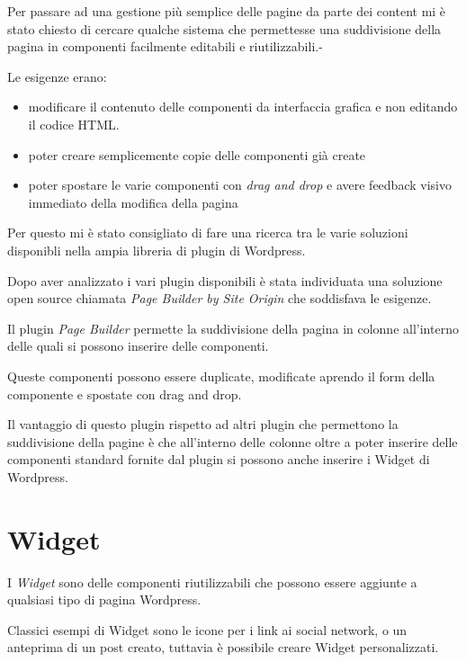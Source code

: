 


Per passare ad una gestione più semplice delle pagine da parte dei content
mi è stato chiesto di cercare qualche sistema che permettesse una suddivisione
della pagina in componenti facilmente editabili e riutilizzabili.-

Le esigenze erano:
\begin{itemize}
\item modificare il contenuto delle componenti da interfaccia grafica e non 
editando il codice HTML.
\item poter creare semplicemente copie delle componenti già create
\item poter spostare le varie componenti con \emph{drag and drop} e avere
feedback visivo immediato della modifica della pagina
\end{itemize}

Per questo mi è stato consigliato di fare una ricerca tra le varie soluzioni disponibli
nella ampia libreria di plugin di Wordpress.


Dopo aver analizzato i vari plugin disponibili è stata individuata una soluzione open source chiamata \emph{Page Builder by
Site Origin} che soddisfava le esigenze.

Il plugin \emph{Page Builder} permette la suddivisione della pagina in colonne all'interno delle quali
si possono inserire delle componenti.

Queste componenti possono essere duplicate, modificate aprendo il form della componente e spostate
con drag and drop.


Il vantaggio di questo plugin rispetto ad altri plugin che permettono la suddivisione della pagine è che all'interno delle colonne
oltre a poter inserire delle componenti standard fornite dal plugin si possono anche inserire i Widget di Wordpress.

\section{Widget}
I \emph{Widget} sono delle componenti riutilizzabili che possono essere aggiunte a qualsiasi
tipo di pagina Wordpress. 

Classici esempi di Widget sono le icone per i link ai social network, o un anteprima di un post creato, tuttavia è possibile creare Widget
personalizzati.

